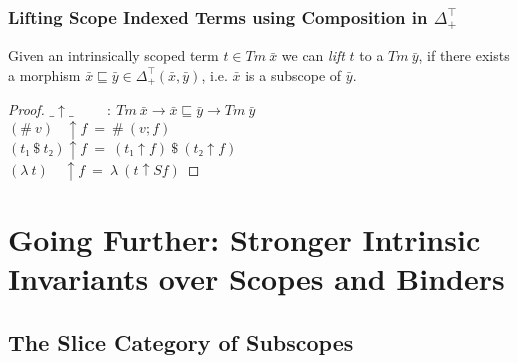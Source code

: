 \documentclass[aspectratio=169]{beamer}
\theoremstyle{remarkstyle}
\begin{document}
\begin{frame}[fragile]
  \frametitle{Lifting Scope Indexed Terms using Composition in $Δ_+^⊤$}
  \begin{lemma}
    Given an intrinsically scoped term $t ∈ Tm \ \bar{x}$ we can \emph{lift} $t$ to a $Tm \ \bar{y}$,
    if there exists a morphism $\bar{x} ⊑ \bar{y} ∈ Δ_+^⊤(\bar{x}, \bar{y})$, 
    i.e. $\bar{x}$ is a subscope of $\bar{y}$.
  \end{lemma}
  \begin{proof}
    $\_↑\_ \ \ \ \ \ \ \ \ \ \ \,  : \ Tm \ \bar{x} → \bar{x} ⊑ \bar{y} → Tm \ \bar{y}$\\
    $(\# \ v) \ \ \  \, ↑ f \ = \ \# \ (v ; f)$\\
    $(t₁ \ \$ \ t₂) ↑ f \ = \ (t₁ ↑ f) \ \$ \ (t₂ ↑ f)$\\
    $(λ \ t) \ \ \ \ \, ↑ f  \ = \ λ \ (t ↑ S f)$
  \end{proof}
\end{frame}


\section{Going Further: Stronger Intrinsic Invariants over Scopes and Binders}
\subsection{The Slice Category of Subscopes}
\end{document}
